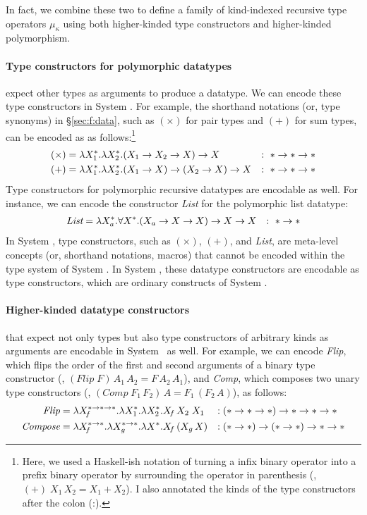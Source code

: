 In fact, we combine these two to define 
a family of kind-indexed recursive type operators $\mu_\kappa$ using both
higher-kinded type constructors and higher-kinded polymorphism.



\paragraph{Type constructors for polymorphic datatypes}\!\!\! expect
other types as arguments to produce a datatype. We can encode these 
type constructors in System \Fw. For example, the shorthand notations
(or, type synonyms) in \S\ref{sec:f:data}, such as $(\times)$ for pair types
and $(+)$ for sum types, can be encoded as as follows:\footnote{Here,
        we used a Haskell-ish notation of turning a infix binary operator
        into a prefix binary operator by surrounding the operator in parenthesis
        (\eg, $(+)\;X_1\,X_2 = X_1 + X_2$). I also annotated the kinds of
        the type constructors after the colon (:).}
\begin{align*}
(\times) &= \lambda X_1^{*}.\lambda X_2^{*}.(X_1 -> X_2 -> X) -> X &:~ * -> * -> * \\
     (+) &= \lambda X_1^{*}.\lambda X_2^{*}.(X_1 -> X) -> (X_2 -> X) -> X &:~ * -> * -> *
\end{align*}
Type constructors for polymorphic recursive datatypes are encodable as well.
For instance, we can encode the constructor \textit{List}
for the polymorphic list datatype:
\begin{align*}
        \textit{List} &= \lambda X_a^{*}.\forall X^{*}.(X_a -> X -> X) -> X -> X
        &:~ * -> *
\end{align*}
In System \F, type constructors, such as $(\times)$, $(+)$, and
\textit{List}, are meta-level concepts (or, shorthand notations, macros)
that cannot be encoded within the type system of System \F.
In System \Fw, these datatype constructors are encodable as type constructors,
which are ordinary constructs of System \Fw.

\paragraph{Higher-kinded datatype constructors}\!\!\! that expect
not only types but also type constructors of arbitrary kinds as arguments
are encodable in System \Fw\ as well. For example, we can encode
\textit{Flip}, which flips the order of the first and second arguments of
a binary type constructor (\ie, $(\textit{Flip}\;F)\,A_1\,A_2 = F\,A_2\,A_1$),
and \textit{Comp}, which composes two unary type constructors
(\ie, $(\textit{Comp}\;F_1\,F_2)\,A = F_1\,(F_2\,A)$), as follows:
\begin{align*}
\textit{Flip} &= \lambda X_{\!f}^{*-> *-> *}.\lambda X_1^{*}.\lambda X_2^{*}.X_{\!f}\,X_2\;X_1
                     &:\;& (* -> * -> *) -> * -> * -> * \\
\textit{Compose} &= \lambda X_{\!f}^{*-> *}.\lambda X_g^{*-> *}.\lambda X^{*}.X_{\!f}\,(X_g\,X)
                     &:\;& (* -> *) -> (* -> *) -> * -> *
\end{align*}

